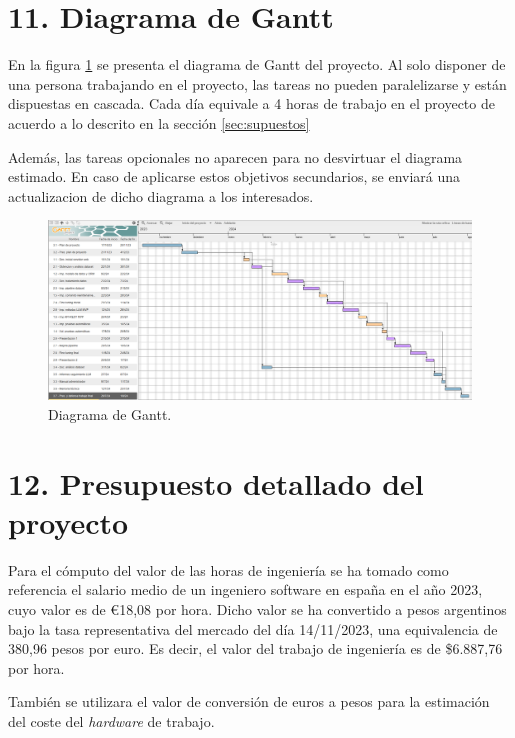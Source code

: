 \documentclass[
11pt, %
]{Clases/charter}
\begin{document}
\section{11. Diagrama de Gantt}
En la figura \ref{fig:diagGantt} se presenta el diagrama de Gantt del proyecto.
Al solo disponer de una persona trabajando en el proyecto, las tareas no pueden paralelizarse y están dispuestas en cascada.
Cada día equivale a 4 horas de trabajo en el proyecto de acuerdo a lo descrito en la sección \ref{sec:supuestos}

Además, las tareas opcionales no aparecen para no desvirtuar el diagrama estimado.
En caso de aplicarse estos objetivos secundarios, se enviará una actualizacion de dicho diagrama a los interesados.

\label{sec:gantt}
\begin{landscape}
	\begin{figure}[htpb]
		\centering
		\includegraphics[height=.67\textheight]{./Figuras/Gantt-2.png}
		\caption{Diagrama de Gantt.}
		\label{fig:diagGantt}
	\end{figure}
\end{landscape}
\section{12. Presupuesto detallado del proyecto}
\label{sec:presupuesto}
Para el cómputo del valor de las horas de ingeniería se ha tomado como referencia el salario medio de un ingeniero software en españa en el año 2023, cuyo valor es de \euro18,08 por hora.
Dicho valor se ha convertido a pesos argentinos bajo la tasa representativa del mercado del día 14/11/2023, una equivalencia de 380,96 pesos por euro.
Es decir, el valor del trabajo de ingeniería es de \$6.887,76 por hora.

También se utilizara el valor de conversión de euros a pesos para la estimación del coste del \textit{hardware} de trabajo.
\end{document}

